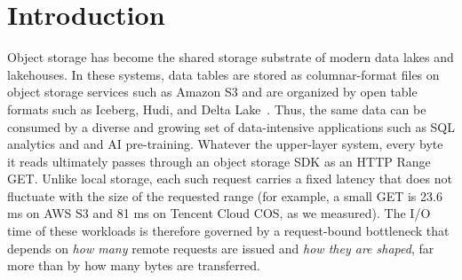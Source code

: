 \section{Introduction}
\label{sec:intro}
Object storage has become the shared storage substrate of modern data lakes and lakehouses.
In these systems, data tables are stored as columnar-format files on object storage services such as Amazon S3 and are organized by open table formats such as Iceberg,
Hudi, and Delta Lake~\cite{iceberg,hudi,deltalake}.
Thus, the same data can be consumed by a diverse and growing set of data-intensive applications such as SQL analytics and %
and AI pre-training.
Whatever the upper-layer system, every byte it reads ultimately passes through an object storage SDK as an HTTP Range GET.
Unlike local storage, each such request carries a fixed latency that does not fluctuate with the size of the requested range (for example, a small GET is 23.6 ms on AWS S3 and 81 ms on Tencent Cloud COS, as we measured).
The I/O time of these workloads is therefore governed by a request-bound bottleneck that depends on \textit{how many} remote requests are issued and \textit{how they are shaped}, far more than by how many bytes are transferred.


